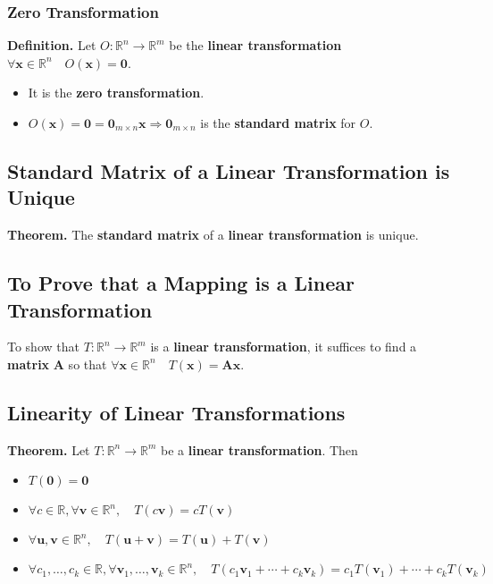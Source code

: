 \documentclass[../ma2001_notes.tex]{subfiles}
\begin{document}
\subsubsection{Zero Transformation}
\textbf{Definition.} Let \(O:\mathbb{R}^n\to\mathbb{R}^m\) be the \textbf{linear transformation} \(\forall\bm{x}\in\mathbb{R}^n\quad O(\bm{x})=\bm{0}\).
\begin{itemize}
	\item It is the \textbf{zero transformation}.
	\item\(O(\bm{x})=\bm{0}=\bm{0}_{m\times n}\bm{x}\Rightarrow\bm{0}_{m\times n}\) is the \textbf{standard matrix} for \(O\).
\end{itemize}

\subsection{Standard Matrix of a Linear Transformation is Unique}
\textbf{Theorem.} The \textbf{standard matrix} of a \textbf{linear transformation} is unique.

\subsection{To Prove that a Mapping is a Linear Transformation}
To show that \(T:\mathbb{R}^n\to\mathbb{R}^m\) is a \textbf{linear transformation}, it suffices to find a \textbf{matrix} \(\bm{A}\) so that \(\forall\bm{x}\in\mathbb{R}^n\quad T(\bm{x})=\bm{Ax}\).

\subsection{Linearity of Linear Transformations}
\textbf{Theorem.} Let \(T:\mathbb{R}^n\to\mathbb{R}^m\) be a \textbf{linear transformation}. Then
\begin{itemize}
	\item\(T(\bm{0})=\bm{0}\)
	\item\(\forall c\in\mathbb{R},\forall\bm{v}\in\mathbb{R}^n,\quad T(c\bm{v})=cT(\bm{v})\)
	\item\(\forall\bm{u},\bm{v}\in\mathbb{R}^n,\quad T(\bm{u}+\bm{v})=T(\bm{u})+T(\bm{v})\)
	\item\(\forall c_1,\ldots,c_k\in\mathbb{R},\forall\bm{v}_1,\ldots,\bm{v}_k\in\mathbb{R}^n,\quad T(c_1\bm{v}_1+\cdots+c_k\bm{v}_k)=c_1T(\bm{v}_1)+\cdots+c_kT(\bm{v}_k)\)
\end{itemize}
\end{document}
